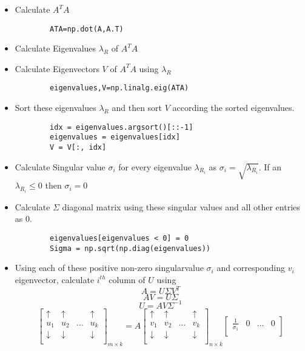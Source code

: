 \documentclass{book}
\begin{document}
\begin{itemize}
	\item Calculate $A^TA$
	\subitem 
	\begin{verbatim}
		ATA=np.dot(A,A.T)
	\end{verbatim}
	\item Calculate Eigenvalues $\lambda_R$ of $A^TA$
	\item Calculate Eigenvectors $V$ of $A^TA$ using 
	$\lambda_R$
	\subitem 
	\begin{verbatim}
		eigenvalues,V=np.linalg.eig(ATA)
	\end{verbatim}
	\item Sort these eigenvalues $\lambda_R$ and then sort $V$ according the sorted eigenvalues.
	\subitem 
	\begin{verbatim}
		idx = eigenvalues.argsort()[::-1]
		eigenvalues = eigenvalues[idx]
		V = V[:, idx]
	\end{verbatim}
	\item Calculate Singular value $\sigma_i$ for every eigenvalue $\lambda_{R_i}$ as $\sigma_i=\sqrt{\lambda_{R_i}}$. If an  $\lambda_{R_i} \leq 0$ then $\sigma_i=0$
	\item Calculate $\Sigma$ diagonal matrix using these singular values and all other entries as 0.
	\subitem 
	\begin{verbatim}
		eigenvalues[eigenvalues < 0] = 0
		Sigma = np.sqrt(np.diag(eigenvalues)) 
	\end{verbatim}
	\item Using each of these positive non-zero singularvalue $\sigma_i$ and corresponding $v_i$ eigenvector, calculate $i^{th}$ column of $U$ using 
	$$
	A=U\Sigma V^T
	$$
	$$
	AV=U\Sigma
	$$
	$$
	U=AV\Sigma^{-1}
	$$
	$$
	\begin{bmatrix}
		\uparrow & \uparrow & & \uparrow\\
		u_1 & u_2 & \dots & u_k\\
		\downarrow & \downarrow & & \downarrow\\
	\end{bmatrix}_{m\times k}=A\begin{bmatrix}
		\uparrow & \uparrow & & \uparrow\\
		v_1 & v_2 & \dots & v_k\\
		\downarrow & \downarrow & & \downarrow\\
	\end{bmatrix}_{n\times k}\begin{bmatrix}
		\frac{1}{\sigma_1} & 0 & \dots & 0\\

\end{bmatrix}$$
\end{itemize}
\end{document}
